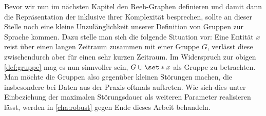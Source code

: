 Bevor wir nun im nächsten Kapitel den Reeb-Graphen definieren und damit dann die Repräsentation der \GrpStruktur inklusive ihrer Komplexität besprechen, sollte an dieser Stelle noch eine kleine Unzulänglichkeit unserer Definition von Gruppen zur Sprache kommen.
Dazu stelle man sich die folgende Situation vor: Eine Entität $x$ reist über einen langen Zeitraum zusammen mit einer Gruppe $G$, verlässt diese zwischendurch aber für einen sehr kurzen Zeitraum.
Im Widerspruch zur obigen \cref{def:gruppe} mag es nun sinnvoller sein, $G \cup \set*{x}$ als Gruppe zu betrachten.
Man möchte die Gruppen also  gegenüber kleinen Störungen machen, die insbesondere bei Daten aus der Praxis oftmals auftreten.
Wie sich dies unter Einbeziehung der maximalen Störungsdauer als weiteren Parameter realisieren lässt, werden in \cref{cha:robust} gegen Ende dieses Arbeit behandeln.
